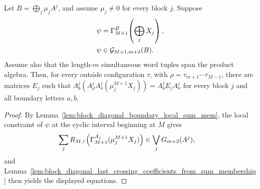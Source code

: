 \begin{lemma}
    \label{lem:block_diagonal_last_crossing_coefficients_from_chain_ground_space}
    \leanok
    Let $B=\bigoplus_j\mu_jA^j$, and assume $\mu_j\ne0$ for every block
    $j$. Suppose
    \begin{align}
        \psi
         & =
        \Gamma_{M+1}^{B}\!\left(\bigoplus_jX_j\right),
        \notag \\
        \psi
         & \in
        \mathcal G_{M+1,m+2}(B).
        \notag
    \end{align}
    Assume also that the length-$m$ simultaneous word tuples span the product
    algebra. Then, for every outside configuration $\tau$, with
    $\rho=\tau_{m+1}\cdots\tau_{M-1}$, there are matrices $E_j$ such that
    $A^j_b(A^j_\rho A^j_a(\mu_j^{M+1}X_j)) = A^j_bE_jA^j_a$
    for every block $j$ and all boundary letters $a,b$.
\end{lemma}

\begin{proof}
    \leanok
    By Lemma~\ref{lem:block_diagonal_boundary_local_sum_mem}, the local
    constraint of $\psi$ at the cyclic interval beginning at $M$ gives
    \begin{align}
        \sum_j
        R_{M,\tau}\!\left(\Gamma_{M+1}^{A_j}(\mu_j^{M+1}X_j)\right)
         & \in
        \bigvee_j G_{m+2}(A^j),
        \notag
    \end{align}
    and
    Lemma~\ref{lem:block_diagonal_last_crossing_coefficients_from_sum_membership}
    then yields the displayed equations.
\end{proof}

